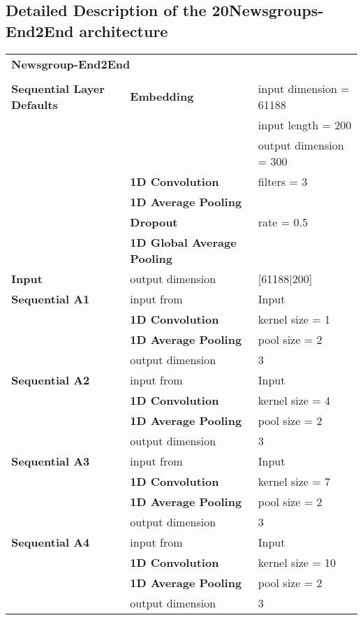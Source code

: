 \begin{appendices}
\chapter{Detailed Description of the 20Newsgroups-End2End architecture}
\begin{tabularx}{\textwidth}[!h]{X X X}
	\multicolumn{3}{X}{\textbf{Newsgroup-End2End}}\\
	\\
	\hline
	\endhead
	\textbf{Sequential Layer Defaults} & \textbf{Embedding} & input dimension = 61188\\
	& & input length = 200\\
	& & output dimension = 300\\
	& \textbf{1D Convolution} & filters = 3\\
	& \textbf{1D Average Pooling} &\\
	& \textbf{Dropout} & rate = 0.5\\
	& \textbf{1D Global Average Pooling} &\\
	\hline
	\textbf{Input} & output dimension & [61188|200]\\
	[8pt]
	\textbf{Sequential A1} & input from & Input\\
	& \textbf{1D Convolution} & kernel size = 1\\
	& \textbf{1D Average Pooling} & pool size = 2\\
	& output dimension & 3\\
	[8pt]
	\textbf{Sequential A2} & input from & Input\\
	& \textbf{1D Convolution} & kernel size = 4\\
	& \textbf{1D Average Pooling} & pool size = 2\\
	& output dimension & 3\\
	[8pt]
	\textbf{Sequential A3} & input from & Input\\
	& \textbf{1D Convolution} & kernel size = 7\\
	& \textbf{1D Average Pooling} & pool size = 2\\
	& output dimension & 3\\
	[8pt]
	\textbf{Sequential A4} & input from & Input\\
	& \textbf{1D Convolution} & kernel size = 10\\
	& \textbf{1D Average Pooling} & pool size = 2\\
	& output dimension & 3\\

\end{tabularx}
\end{appendices}
